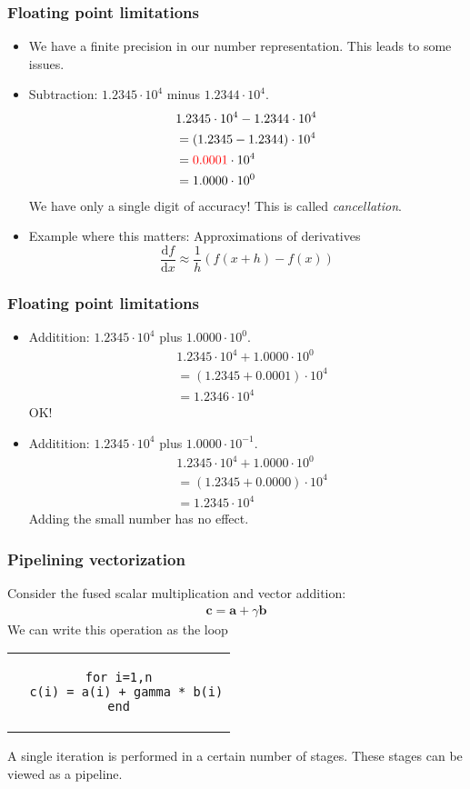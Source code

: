 \begin{frame}
  \frametitle{Floating point limitations}
  \begin{itemize}
  \item We have a finite precision in our number representation. This leads to
    some issues.
  \item Subtraction: $1.2345\cdot 10^4$ minus $1.2344\cdot 10^4$.
    \begin{align*}
      & 1.2345 \cdot 10^4 - 1.2344 \cdot 10^4 \\
      &= (1.2345 - 1.2344) \cdot 10^4 \\
      &= \textcolor{red}{0.0001} \cdot 10^4 \\
      &= 1.0000 \cdot 10^0
    \end{align*}
    We have only a single digit of accuracy! This is called \emph{cancellation}.
  \item Example where this matters: Approximations of derivatives
    \[
      \frac{\text{d}f}{\text{d}x} \approx \frac{1}{h}\left( f(x+h) - f(x) \right)
    \]
  \end{itemize}
\end{frame}

\begin{frame}
  \frametitle{Floating point limitations}
  \begin{itemize}
  \item Additition: $1.2345\cdot 10^4$ plus $1.0000\cdot 10^0$.
    \begin{align*}
      & 1.2345 \cdot 10^4 + 1.0000 \cdot 10^0 \\
      &= (1.2345 + 0.0001) \cdot 10^4 \\
      &= 1.2346 \cdot 10^4
    \end{align*}
    OK!
  \item Additition: $1.2345\cdot 10^4$ plus $1.0000\cdot 10^{-1}$.
    \begin{align*}
      & 1.2345 \cdot 10^4 + 1.0000 \cdot 10^0 \\
      &= (1.2345 + 0.0000) \cdot 10^4 \\
      &= 1.2345 \cdot 10^4
    \end{align*}
    Adding the small number has no effect.
  \end{itemize}
\end{frame}

\begin{frame}[fragile]
  \frametitle{Pipelining vectorization}
  Consider the fused scalar multiplication and vector addition:
  \begin{align*}
    \bm c = \bm a + \gamma \bm b
  \end{align*}
  We can write this operation as the loop
  \begin{center}
    \begin{tabular}{c}
\begin{lstlisting}[style=fortran]
for i=1,n
  c(i) = a(i) + gamma * b(i)
end
\end{lstlisting}
    \end{tabular}
  \end{center}
  A single iteration is performed in a certain number of stages. These stages
  can be viewed as a pipeline.
\end{frame}

